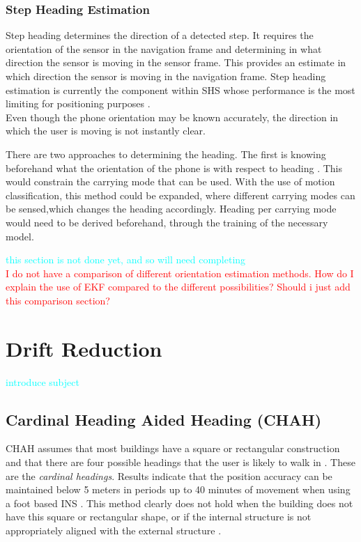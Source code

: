 \subsubsection{Step Heading Estimation}
Step heading determines the direction of a detected step. It requires the orientation of the sensor in the navigation frame and determining in what direction the sensor is moving in the sensor frame. This provides an estimate in which direction the sensor is moving in the navigation frame.  Step heading estimation is currently the component within SHS whose performance is the most limiting for positioning purposes \cite{Diez2018b, Qian2013,Combettes2017}.\\
Even though the phone orientation may be known accurately, the direction in which the user is moving is not instantly clear. \par
There are two approaches to determining the heading. The first is knowing beforehand what the orientation of the phone is with respect to heading \cite{Tian2016}.  This would constrain the carrying mode that can be used.  With the use of motion classification, this method could be expanded, where different carrying modes can be sensed,which changes the heading accordingly. Heading per carrying mode would need to be derived beforehand, through the training of the necessary model. 

\textcolor{cyan}{this section is not done yet, and so will need completing } \\ \newline
\textcolor{red}{I do not have a comparison of different orientation estimation methods. How do I explain the use of EKF compared to the different possibilities? Should i just add this comparison section?}

\section{Drift Reduction}
\textcolor{cyan}{introduce subject}
\subsection*{Cardinal Heading Aided Heading (CHAH)}
CHAH assumes that most buildings have a square or rectangular construction and that there are four possible headings that the user is likely to walk in \cite{Abdulrahim2011}. These are the \textit{cardinal headings}. Results indicate that the position accuracy can be maintained below 5 meters in periods up to 40 minutes of movement when using a foot based \ac{INS}  \cite{Abdulrahim2011}. This method clearly does not hold when the building does not have this square or rectangular shape, or if the internal structure is not appropriately aligned with the external structure \cite{Davidson2017}.



